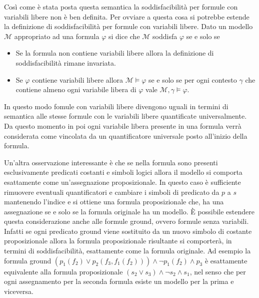 \documentclass[./main.tex]{subfiles}
\begin{document}
Così come è stata posta questa semantica la soddisfacibilità per formule con variabili libere non è ben definita.
Per ovviare a questa cosa si potrebbe estende la definizione di soddisfacibilità per formule con variabili libere.
Dato un modello $\mathcal{M}$ appropriato ad una formula $\varphi$ si dice che $\mathcal{M}$ soddisfa $\varphi$ se e solo se
\begin{itemize}
  \item Se la formula non contiene variabili libere allora la definizione di soddisfacibilità rimane invariata.
  \item Se $\varphi$ contiene variabili libere allora $\mathcal{M} \models \varphi$ se e solo se
  per ogni contesto $\gamma$ che contiene almeno ogni variabile libera di $\varphi$ vale $\mathcal{M}, \gamma \models \varphi$.
\end{itemize}

In questo modo fomule con variabili libere divengono 
uguali in termini di semantica alle stesse formule con le variabili libere quantificate universalmente.
Da questo momento in poi ogni variabile libera presente in una formula verrà considerata come vincolata da un quantificatore universale posto all'inizio della formula.

Un'altra osservazione interessante è che se nella formula sono presenti esclusivamente predicati costanti e simboli logici allora il modello si comporta 
esattamente come un'assegnazione proposizionale. 
In questo caso è sufficiente rimuovere eventuali quantificatori e cambiare i simboli di predicato da $p$ a $s$ mantenendo l'indice e si ottiene una 
formula proposizionale che, ha una assegnazione se e solo se la formula originale ha un modello.
È possibile estendere questa considerazione anche alle formule ground, ovvero formule senza variabili.
Infatti se ogni predicato ground viene sostituito da un nuovo simbolo di costante proposizionale allora la formula proposizionale risultante si comporterà, in termini di soddisfacibilità,
esattamente come la formula originale. Ad esempio la formula ground $(p_1(f_2) \lor p_2(f_3, f_1(f_2))) \land \lnot p_1(f_2) \land p_3$ 
è esattamente equivalente alla formula proposizionale $(s_2 \lor s_3) \land \lnot s_2 \land s_1$, nel senso che per ogni assegnamento per la seconda formula
esiste un modello per la prima e viceversa.
\end{document}
